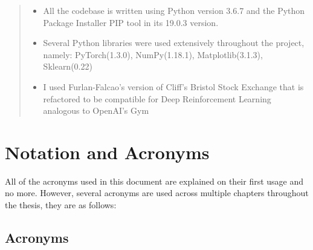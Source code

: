 \documentclass[ %
                    author={Ashwinder Khurana},
                supervisor={Prof Dave Cliff},
                    degree={MEng},
                     title={The Deeply Reinforced Trader},
                  subtitle={},
                      type={enterprise},
                      year={2020} ]{dissertation}
\begin{document}
\begin{quote}
\noindent
\begin{itemize}
\item All the codebase is written using Python version 3.6.7 and the Python Package Installer PIP tool in its 19.0.3 version.
\item Several Python libraries were used extensively throughout the project, namely: PyTorch(1.3.0), NumPy(1.18.1), Matplotlib(3.1.3), Sklearn(0.22)
\item I used Furlan-Falcao's version of Cliff's Bristol Stock Exchange that is refactored to be compatible for Deep Reinforcement Learning analogous to OpenAI's Gym 

\end{itemize}
\end{quote}


\chapter*{Notation and Acronyms}

\noindent
All of the acronyms used in this document are explained on their first usage and no more. However, several acronyms are used across multiple chapters throughout the thesis, they are as follows:

\section*{Acronyms}
\end{document}

